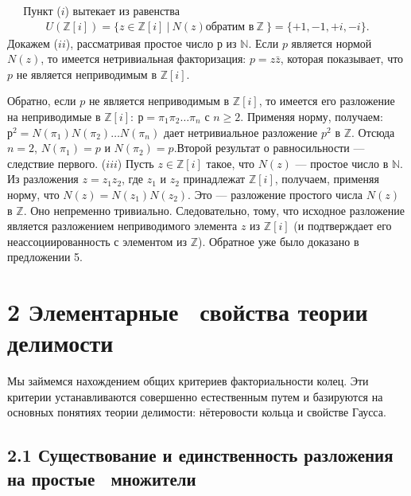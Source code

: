 \begin{myproof}
$\;\;\;\;$ Пункт ($i$) вытекает из равенства
\begin{align*}
U(\mathds{Z}[i]) = \{z \in \mathds{Z}[i]\:|\:N(z) \text{обратим в}\:\mathds{Z}\:\} = \{+1,-1,+i,-i\}\text{.}
\end{align*}
\indent Докажем ($ii$), рассматривая простое число $р$ из $\mathds{N}$. Если $p$ является нормой $N(z)$, то имеется нетривиальная факторизация: $p = z\bar{z}$, которая показывает, что $p$ не является неприводимым в $\mathds{Z}[i]$.

\newpage

Обратно, если $p$ не является неприводимым в $\mathds{Z}[i]$, то имеется его разложение на неприводимые в $\mathds{Z}[i]:\:р = \pi_1 \pi_2 \dots \pi_n$ с $n \geqslant 2$. Применяя норму, получаем: $р^2 = N(\pi_1) N(\pi_2) \dots N(\pi_n)$ дает нетривиальное разложение $p^2$ в $\mathds{Z}$. Отсюда $n = 2$, $N(\pi_1) = p$ и $N(\pi_2) = p$.\newline \indent Второй результат о равносильности — следствие первого. \newline \indent ($iii$) Пусть $z \in \mathds{Z}[i]$ такое, что $N(z)$ — простое число в $\mathds{N}$. Из разложения $z = z_1 z_2$, где $z_1$ и $z_2$ принадлежат $\mathds{Z}[i]$, получаем, применяя норму, что $N(z) = N(z_1 ) N(z_2 )$. Это — разложение простого числа $N(z)$ в $\mathds{Z}$. Оно непременно тривиально. Следовательно, тому, что исходное разложение является разложением неприводимого элемента $z$ из $\mathds{Z}[i]$ (и подтверждает его неассоциированность с элементом из $\mathds{Z}$). Обратное уже было доказано в предложении 5.
\end{myproof}

\section{\large{2 Элементарные~ свойства теории~ делимости}}

Мы займемся нахождением общих критериев факториальности колец. Эти критерии устанавливаются совершенно естественным путем и ба­зируются на основных понятиях теории делимости: нётеровости кольца и свойстве Гаусса.

\subsection{2.1 Существование и единственность разложения на \newline простые~ множители}

